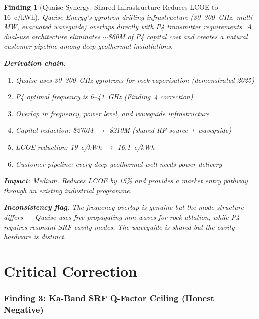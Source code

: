 \documentclass[11pt]{article}
\newtheorem{finding}{Finding}
\begin{document}
\begin{finding}[Quaise Synergy: Shared Infrastructure Reduces LCOE to 16~c/kWh]
\label{find:quaise-synergy}
Quaise Energy's gyrotron drilling infrastructure (30--300~GHz, multi-MW,
evacuated waveguide) overlaps directly with P4 transmitter requirements.
A dual-use architecture eliminates $\sim$\$60M of P4 capital cost and
creates a natural customer pipeline among deep geothermal installations.

\textbf{Derivation chain}:
\begin{enumerate}[nosep]
\item Quaise uses 30--300~GHz gyrotrons for rock vaporisation (demonstrated 2025)
\item P4 optimal frequency is 6--41~GHz (Finding~4 correction)
\item Overlap in frequency, power level, and waveguide infrastructure
\item Capital reduction: \$270M $\to$ \$210M (shared RF source + waveguide)
\item LCOE reduction: 19~c/kWh $\to$ 16.1~c/kWh
\item Customer pipeline: every deep geothermal well needs power delivery
\end{enumerate}

\textbf{Impact}: Medium. Reduces LCOE by 15\% and provides a market entry
pathway through an existing industrial programme.

\textbf{Inconsistency flag}: The frequency overlap is genuine but the
\emph{mode structure} differs --- Quaise uses free-propagating mm-waves
for rock ablation, while P4 requires resonant SRF cavity modes. The
waveguide is shared but the cavity hardware is distinct.
\end{finding}

\part{Critical Correction}
\label{part:correction}

\section{Finding 3: Ka-Band SRF Q-Factor Ceiling (Honest Negative)}
\label{sec:q-ceiling}
\end{document}
